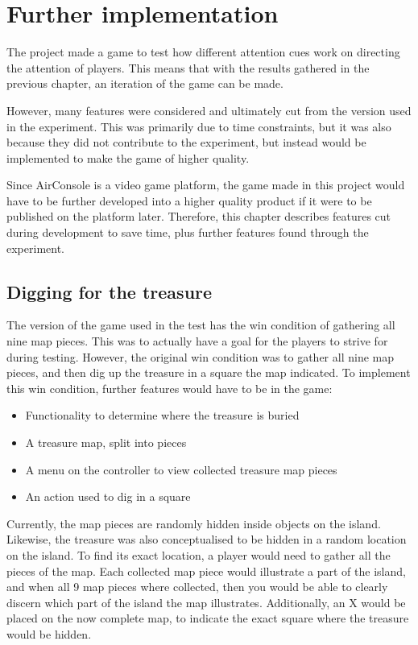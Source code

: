 \chapter{Further implementation}\label{ch:further_implementation}
The project made a game to test how different attention cues work on directing the attention of players. This means that with the results gathered in the previous chapter, an iteration of the game can be made.

However, many features were considered and ultimately cut from the version used in the experiment. This was primarily due to time constraints, but it was also because they did not contribute to the experiment, but instead would be implemented to make the game of higher quality.

Since AirConsole is a video game platform, the game made in this project would have to be further developed into a higher quality product if it were to be published on the platform later. Therefore, this chapter describes features cut during development to save time, plus further features found through the experiment.

\section{Digging for the treasure}\label{sec:digging}
The version of the game used in the test has the win condition of gathering all nine map pieces. This was to actually have a goal for the players to strive for during testing.
However, the original win condition was to gather all nine map pieces, and then dig up the treasure in a square the map indicated. To implement this win condition, further features would have to be in the game:
\begin{itemize}
\item Functionality to determine where the treasure is buried
\item A treasure map, split into pieces
\item A menu on the controller to view collected treasure map pieces
\item An action used to dig in a square
\end{itemize}

Currently, the map pieces are randomly hidden inside objects on the island. Likewise, the treasure was also conceptualised to be hidden in a random location on the island. To find its exact location, a player would need to gather all the pieces of the map. Each collected map piece would illustrate a part of the island, and when all 9 map pieces where collected, then you would be able to clearly discern which part of the island the map illustrates. Additionally, an X would be placed on the now complete map, to indicate the exact square where the treasure would be hidden.

